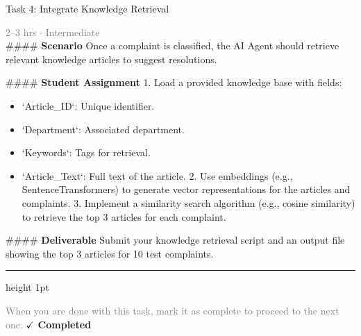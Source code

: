 \documentclass[10pt,a4paper]{article}
\begin{document}
\begin{taskbox}{Task 4: Integrate Knowledge Retrieval}

    {\small \textcolor{gray}{2--3 hrs $\cdot$ Intermediate}}\\[12pt]

    \#\#\#\# \textbf{Scenario}  
Once a complaint is classified, the AI Agent should retrieve relevant knowledge articles to suggest resolutions.  

\#\#\#\# \textbf{Student Assignment}  
1. Load a provided knowledge base with fields:  
\begin{itemize}
    \item `Article\_ID`: Unique identifier.  
    \item `Department`: Associated department.  
    \item `Keywords`: Tags for retrieval.  
    \item `Article\_Text`: Full text of the article.  
2. Use embeddings (e.g., SentenceTransformers) to generate vector representations for the articles and complaints.  
3. Implement a similarity search algorithm (e.g., cosine similarity) to retrieve the top 3 articles for each complaint.  
\end{itemize}

\#\#\#\# \textbf{Deliverable}  
Submit your knowledge retrieval script and an output file showing the top 3 articles for 10 test complaints.\par

    \vspace{16pt}

    \textcolor{cardBorder}{\hrule height 1pt}\vspace{8pt}

    \small \textcolor{gray}{When you are done with this task, mark it as complete to proceed to the next one.} \hfill \textbf{\textcolor{brandDark}{$\checkmark$ Completed}}

\end{taskbox}
\end{document}

